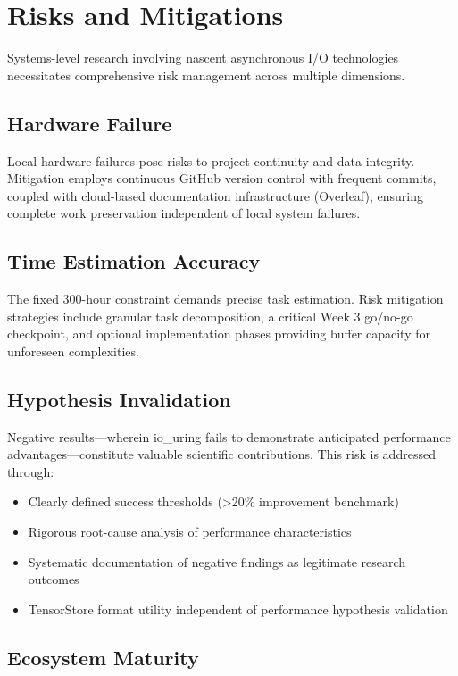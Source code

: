 \documentclass{article}
\begin{document}
\section{Risks and Mitigations}

Systems-level research involving nascent asynchronous I/O technologies necessitates comprehensive risk management across multiple dimensions.

\subsection{Hardware Failure}

Local hardware failures pose risks to project continuity and data integrity. Mitigation employs continuous GitHub version control with frequent commits, coupled with cloud-based documentation infrastructure (Overleaf), ensuring complete work preservation independent of local system failures.

\subsection{Time Estimation Accuracy}

The fixed 300-hour constraint demands precise task estimation. Risk mitigation strategies include granular task decomposition, a critical Week 3 go/no-go checkpoint, and optional implementation phases providing buffer capacity for unforeseen complexities.

\subsection{Hypothesis Invalidation}

Negative results—wherein io\_uring fails to demonstrate anticipated performance advantages—constitute valuable scientific contributions. This risk is addressed through:
\begin{itemize}
\item Clearly defined success thresholds (>20\% improvement benchmark)
\item Rigorous root-cause analysis of performance characteristics
\item Systematic documentation of negative findings as legitimate research outcomes
\item TensorStore format utility independent of performance hypothesis validation
\end{itemize}

\subsection{Ecosystem Maturity}
\end{document}
